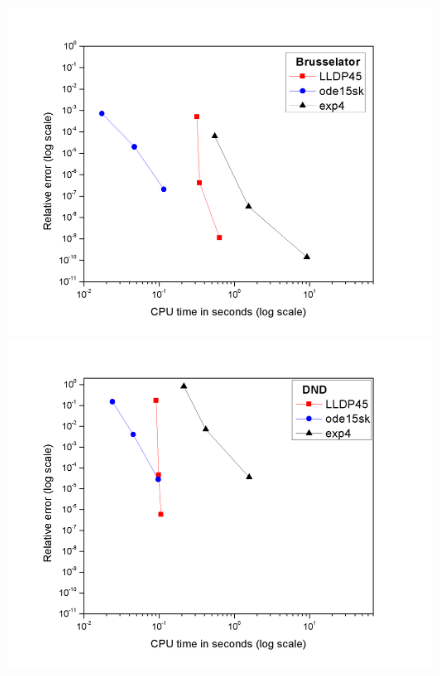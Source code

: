 \documentclass{article}
\begin{document}
\begin{figure}
\begin{minipage}{.5\textwidth}
	\hspace{-0.8in}\includegraphics[scale=0.4]{Brusselator.png}
\end{minipage}
\begin{minipage}{.49\textwidth}
	\vspace{-0.4in}
	\includegraphics[scale=0.4]{DND.png}
\end{minipage}
	
\end{figure}
\end{document}
